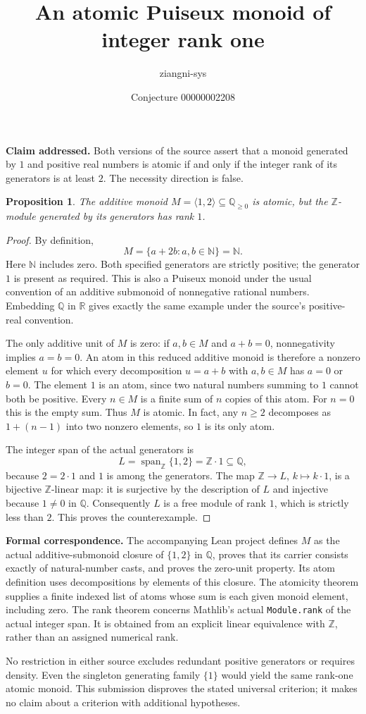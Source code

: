 \documentclass[11pt]{article}
\title{An atomic Puiseux monoid of integer rank one}
\author{ziangni-sys}
\date{Conjecture 00000002208}
\newtheorem{proposition}{Proposition}
\begin{document}
\maketitle
\noindent\textbf{Claim addressed.} Both versions of the source assert that a monoid generated by $1$ and positive real numbers is atomic if and only if the integer rank of its generators is at least $2$. The necessity direction is false.

\begin{proposition}
The additive monoid $M=\langle 1,2\rangle\subseteq\mathbb Q_{\geq0}$ is atomic, but the $\mathbb Z$-module generated by its generators has rank $1$.
\end{proposition}
\begin{proof}
By definition,
\[
 M=\{a+2b:a,b\in\mathbb N\}=\mathbb N.
\]
Here $\mathbb N$ includes zero. Both specified generators are strictly positive; the generator $1$ is present as required. This is also a Puiseux monoid under the usual convention of an additive submonoid of nonnegative rational numbers. Embedding $\mathbb Q$ in $\mathbb R$ gives exactly the same example under the source's positive-real convention.

The only additive unit of $M$ is zero: if $a,b\in M$ and $a+b=0$, nonnegativity implies $a=b=0$. An atom in this reduced additive monoid is therefore a nonzero element $u$ for which every decomposition $u=a+b$ with $a,b\in M$ has $a=0$ or $b=0$. The element $1$ is an atom, since two natural numbers summing to $1$ cannot both be positive. Every $n\in M$ is a finite sum of $n$ copies of this atom. For $n=0$ this is the empty sum. Thus $M$ is atomic. In fact, any $n\geq2$ decomposes as $1+(n-1)$ into two nonzero elements, so $1$ is its only atom.

The integer span of the actual generators is
\[
 L=\operatorname{span}_{\mathbb Z}\{1,2\}
   =\mathbb Z\cdot 1\subseteq\mathbb Q,
\]
because $2=2\cdot1$ and $1$ is among the generators. The map $\mathbb Z\to L$, $k\mapsto k\cdot1$, is a bijective $\mathbb Z$-linear map: it is surjective by the description of $L$ and injective because $1\ne0$ in $\mathbb Q$. Consequently $L$ is a free module of rank $1$, which is strictly less than $2$. This proves the counterexample.
\end{proof}

\noindent\textbf{Formal correspondence.} The accompanying Lean project defines $M$ as the actual additive-submonoid closure of $\{1,2\}$ in $\mathbb Q$, proves that its carrier consists exactly of natural-number casts, and proves the zero-unit property. Its atom definition uses decompositions by elements of this closure. The atomicity theorem supplies a finite indexed list of atoms whose sum is each given monoid element, including zero. The rank theorem concerns Mathlib's actual \texttt{Module.rank} of the actual integer span. It is obtained from an explicit linear equivalence with $\mathbb Z$, rather than an assigned numerical rank.

\medskip
\noindent No restriction in either source excludes redundant positive generators or requires density. Even the singleton generating family $\{1\}$ would yield the same rank-one atomic monoid. This submission disproves the stated universal criterion; it makes no claim about a criterion with additional hypotheses.
\end{document}
